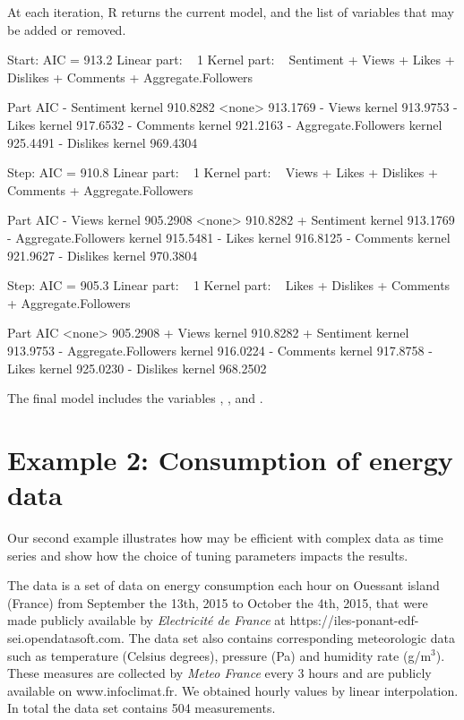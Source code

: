 At each iteration, R returns the current model, and the list of variables that may be added or removed.


\begin{example}
Start: AIC = 913.2
Linear part: ~ 1
Kernel part: ~ Sentiment + Views + Likes + Dislikes + Comments +
               Aggregate.Followers

                        Part      AIC
- Sentiment           kernel 910.8282
<none>                       913.1769
- Views               kernel 913.9753
- Likes               kernel 917.6532
- Comments            kernel 921.2163
- Aggregate.Followers kernel 925.4491
- Dislikes            kernel 969.4304


Step: AIC = 910.8
Linear part: ~ 1
Kernel part: ~ Views + Likes + Dislikes + Comments + Aggregate.Followers

                        Part      AIC
- Views               kernel 905.2908
<none>                       910.8282
+ Sentiment           kernel 913.1769
- Aggregate.Followers kernel 915.5481
- Likes               kernel 916.8125
- Comments            kernel 921.9627
- Dislikes            kernel 970.3804


Step: AIC = 905.3
Linear part: ~ 1
Kernel part: ~ Likes + Dislikes + Comments + Aggregate.Followers

                        Part      AIC
<none>                       905.2908
+ Views               kernel 910.8282
+ Sentiment           kernel 913.9753
- Aggregate.Followers kernel 916.0224
- Comments            kernel 917.8758
- Likes               kernel 925.0230
- Dislikes            kernel 968.2502
\end{example}


The final model includes the variables , ,  and . 



\section{Example 2: Consumption of energy data} \label{sec:illustrations-energy}
Our second example illustrates how  may be efficient with complex data as time series and show how the choice of tuning parameters impacts the results.

The  data is a set of data on energy consumption each hour on Ouessant island (France) from September the 13th, 2015 to October the 4th, 2015, that were made publicly available by \textit{Electricit\'e de France} at https://iles-ponant-edf-sei.opendatasoft.com. The data set also contains corresponding meteorologic data such as temperature (Celsius degrees), pressure (Pa) and humidity rate (g/m$^3$). These measures are collected by \textit{Meteo France} every 3 hours and are publicly available on www.infoclimat.fr. We obtained hourly values by linear interpolation. In total the data set contains 504 measurements.


